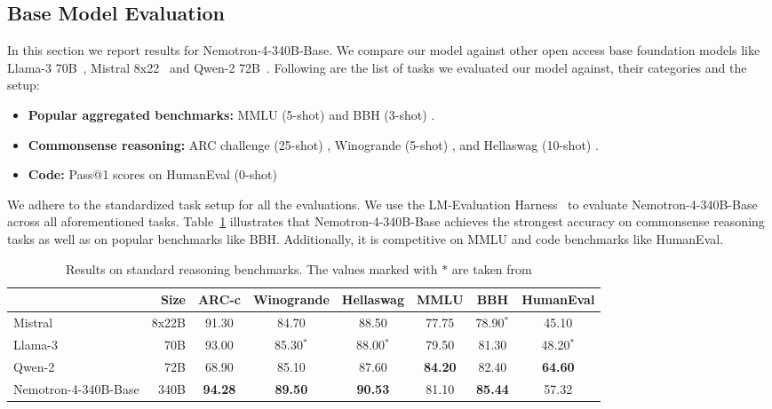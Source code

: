 \documentclass[11pt]{article}
\newcommand{\ours}{Nemotron-4-340B-Base}
\begin{document}
\subsection{Base Model Evaluation} 
\label{sec:base-model-eval}

In this section we report results for \ours{}.
We compare our model against other open access base foundation models like Llama-3 70B~\citep{llama3}, Mistral 8x22~\citep{mixtral-8x22b} and Qwen-2 72B~\citep{qwen2}.
Following are the list of tasks we evaluated our model against, their categories and the setup:
\begin{itemize}
    \item \textbf{Popular aggregated benchmarks:} MMLU (5-shot) \citep{hendrycks2020measuring} and BBH (3-shot) \citep{suzgun2022challenging}.
    \item \textbf{Commonsense reasoning:}  ARC challenge (25-shot) \citep{clark2018think}, Winogrande (5-shot) \citep{Sakaguchi2020WINOGRANDEAA}, and Hellaswag (10-shot)  \citep{Zellers2019HellaSwagCA}.    
    \item \textbf{Code:} Pass@1 scores on HumanEval (0-shot) \citep{chen2021evaluating} 
\end{itemize}

We adhere to the standardized task setup for all the evaluations.
We use the LM-Evaluation Harness~\citep{eval-harness} to evaluate \ours{} across all aforementioned
tasks. 
Table~\ref{tab:lm_eval_harness_external} illustrates that \ours{} achieves the strongest accuracy on commonsense reasoning tasks as well as on popular benchmarks like BBH.
Additionally, it is competitive on MMLU and code benchmarks like HumanEval.

\begin{table}[H]
\centering
\begin{adjustbox}{max width=\textwidth, scale=1.0}
\begin{tabular}{lrcccccc}
\toprule
& Size & ARC-c & Winogrande & Hellaswag & MMLU & BBH & HumanEval \\ 
\midrule
Mistral  & 8x22B & 91.30 & 84.70 & 88.50 & 77.75 & 78.90$^{*}$ & 45.10 \\
\midrule
Llama-3 & 70B & 93.00 & 85.30$^{*}$ & 88.00$^{*}$ & 79.50 & 81.30 & 48.20$^{*}$ \\
\midrule
Qwen-2 & 72B & 68.90 & 85.10 & 87.60 & \textbf{84.20} & 82.40 & \textbf{64.60} \\
\midrule
\ours{} & 340B & \textbf{94.28} & \textbf{89.50} & \textbf{90.53} & 81.10 & \textbf{85.44} & 57.32 \\
\bottomrule
\end{tabular}
\end{adjustbox}
\caption{\label{tab:lm_eval_harness_external} Results on standard reasoning benchmarks. The values marked with $*$ are taken from ~\citet{qwen2} }
\end{table}
\end{document}
